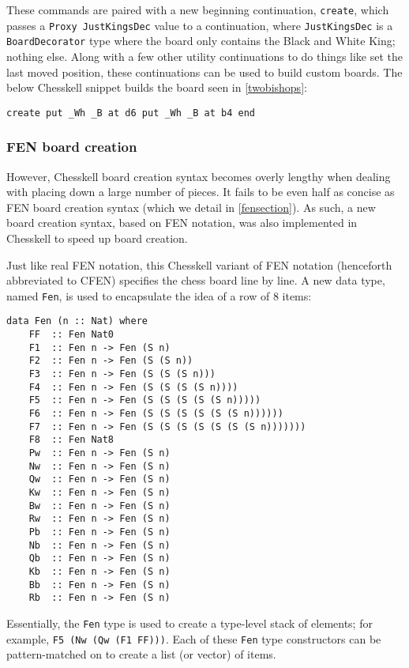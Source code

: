 \documentclass[12pt, a4paper, bibliography=totocnumbered]{scrreprt}
\newcommand{\inline}[1]{\lstinline[basicstyle=\ttfamily\footnotesize]{#1}}
\begin{document}
These commands are paired with a new beginning continuation, \inline{create}, which passes a \inline{Proxy JustKingsDec} value to a continuation, where \inline{JustKingsDec} is a \inline{BoardDecorator} type where the board only contains the Black and White King; nothing else. Along with a few other utility continuations to do things like set the last moved position, these continuations can be used to build custom boards. The below Chesskell snippet builds the board seen in \cref{twobishops}:

\begin{lstlisting}
create put _Wh _B at d6 put _Wh _B at b4 end
\end{lstlisting}

\subsubsection{FEN board creation}

However, Chesskell board creation syntax becomes overly lengthy when dealing with placing down a large number of pieces. It fails to be even half as concise as FEN board creation syntax (which we detail in \cref{fensection}). As such, a new board creation syntax, based on FEN notation, was also implemented in Chesskell to speed up board creation.

Just like real FEN notation, this Chesskell variant of FEN notation (henceforth abbreviated to CFEN) specifies the chess board line by line. A new data type, named \inline{Fen}, is used to encapsulate the idea of a row of 8 items:

\begin{lstlisting}
data Fen (n :: Nat) where
    FF  :: Fen Nat0
    F1  :: Fen n -> Fen (S n)
    F2  :: Fen n -> Fen (S (S n))
    F3  :: Fen n -> Fen (S (S (S n)))
    F4  :: Fen n -> Fen (S (S (S (S n))))
    F5  :: Fen n -> Fen (S (S (S (S (S n)))))
    F6  :: Fen n -> Fen (S (S (S (S (S (S n))))))
    F7  :: Fen n -> Fen (S (S (S (S (S (S (S n)))))))
    F8  :: Fen Nat8
    Pw  :: Fen n -> Fen (S n)
    Nw  :: Fen n -> Fen (S n)
    Qw  :: Fen n -> Fen (S n)
    Kw  :: Fen n -> Fen (S n)
    Bw  :: Fen n -> Fen (S n)
    Rw  :: Fen n -> Fen (S n)
    Pb  :: Fen n -> Fen (S n)
    Nb  :: Fen n -> Fen (S n)
    Qb  :: Fen n -> Fen (S n)
    Kb  :: Fen n -> Fen (S n)
    Bb  :: Fen n -> Fen (S n)
    Rb  :: Fen n -> Fen (S n)
\end{lstlisting}

Essentially, the \inline{Fen} type is used to create a type-level stack of elements; for example, \inline{F5 (Nw (Qw (F1 FF)))}. Each of these \inline{Fen} type constructors can be pattern-matched on to create a list (or vector) of items.
\end{document}
